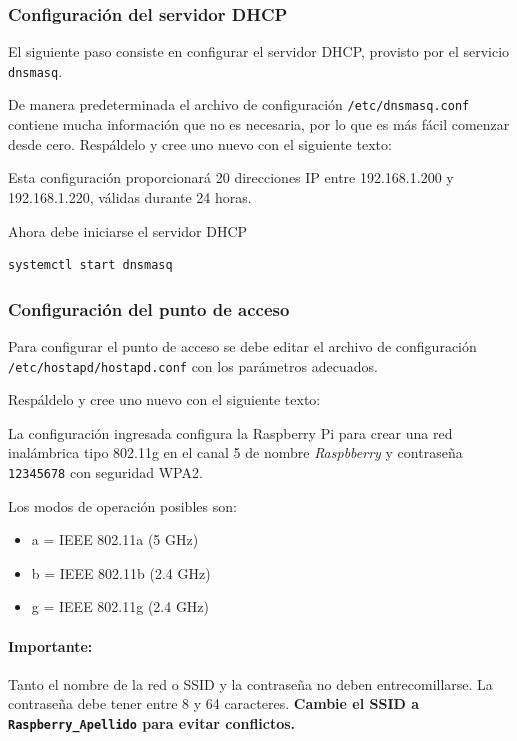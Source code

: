 \documentclass[letterpaper,10.5pt]{article}
\begin{document}
\subsubsection{Configuración del servidor DHCP}%
\label{sec:ap-dhcp}
El siguiente paso consiste en configurar el servidor DHCP, provisto por el servicio \texttt{dnsmasq}.

De manera predeterminada el archivo de configuración \texttt{/etc/dnsmasq.conf} contiene mucha información que no es necesaria, por lo que es más fácil comenzar desde cero.
Respáldelo y cree uno nuevo con el siguiente texto:


Esta configuración proporcionará 20 direcciones IP entre 192.168.1.200 y 192.168.1.220, válidas durante 24 horas.

Ahora debe iniciarse el servidor DHCP

\begin{Verbatim}
systemctl start dnsmasq
\end{Verbatim}

\subsubsection{Configuración del punto de acceso}%
\label{sec:ap-hotspot}
Para configurar el punto de acceso se debe editar el archivo de configuración \texttt{/etc/hostapd/hostapd.conf} con los parámetros adecuados.

Respáldelo y cree uno nuevo con el siguiente texto:


La configuración ingresada configura la Raspberry Pi para crear una red inalámbrica tipo 802.11g en el canal 5 de nombre \emph{Raspbberry} y contraseña \texttt{12345678} con seguridad WPA2.

Los modos de operación posibles son:
\begin{itemize}[nosep]
\item a = IEEE 802.11a (5 GHz)
\item b = IEEE 802.11b (2.4 GHz)
\item g = IEEE 802.11g (2.4 GHz)
\end{itemize}

\paragraph*{Importante:} Tanto el nombre de la red o SSID y la contraseña no deben entrecomillarse. La contraseña debe tener entre 8 y 64 caracteres. \textbf{Cambie el SSID a \texttt{Raspberry\_Apellido} para evitar conflictos.}\medskip
\end{document}
